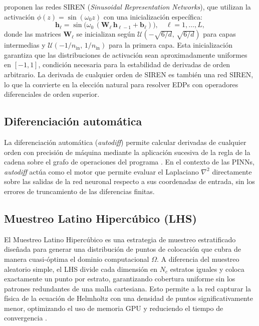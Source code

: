 \textcite{sitzmann2020siren} proponen las redes SIREN
(\textit{Sinusoidal Representation Networks}), que utilizan la activación
$\phi(z) = \sin(\omega_0 z)$ con una inicialización específica:
%
\begin{equation}
    \mathbf{h}_\ell = \sin\!\bigl(\omega_0\,
    (\mathbf{W}_\ell\,\mathbf{h}_{\ell-1} + \mathbf{b}_\ell)\bigr),
    \quad \ell = 1, \ldots, L,
    \label{eq:siren}
\end{equation}
%
donde las matrices $\mathbf{W}_\ell$ se inicializan según
$\mathcal{U}(-\sqrt{6/d},\, \sqrt{6/d})$ para capas intermedias y
$\mathcal{U}(-1/n_\text{in},\, 1/n_\text{in})$ para la primera capa. Esta
inicialización garantiza que las distribuciones de activación sean
aproximadamente uniformes en $[-1,1]$, condición necesaria para la estabilidad
de derivadas de orden arbitrario. La derivada de cualquier orden de SIREN es
también una red SIREN, lo que la convierte en la elección natural para resolver
EDPs con operadores diferenciales de orden superior.

\subsection{Diferenciación automática}

La diferenciación automática (\textit{autodiff}) permite calcular derivadas de
cualquier orden con precisión de máquina mediante la aplicación sucesiva de la
regla de la cadena sobre el grafo de operaciones del programa
\parencite{baydin2018autodiff}. En el contexto de las PINNs, \textit{autodiff}
actúa como el motor que permite evaluar el Laplaciano $\nabla^2$ directamente
sobre las salidas de la red neuronal respecto a sus coordenadas de entrada, sin
los errores de truncamiento de las diferencias finitas.

\subsection{Muestreo Latino Hipercúbico (LHS)}

El Muestreo Latino Hipercúbico \parencite{mckay1979lhs} es una estrategia de
muestreo estratificado diseñada para generar una distribución de puntos de
colocación que cubra de manera cuasi-óptima el dominio computacional $\Omega$.
A diferencia del muestreo aleatorio simple, el LHS divide cada dimensión en
$N_c$ estratos iguales y coloca exactamente un punto por estrato, garantizando
cobertura uniforme sin los patrones redundantes de una malla cartesiana. Esto
permite a la red capturar la física de la ecuación de Helmholtz con una densidad
de puntos significativamente menor, optimizando el uso de memoria GPU y
reduciendo el tiempo de convergencia \parencite{cuomo2022scientific}.

